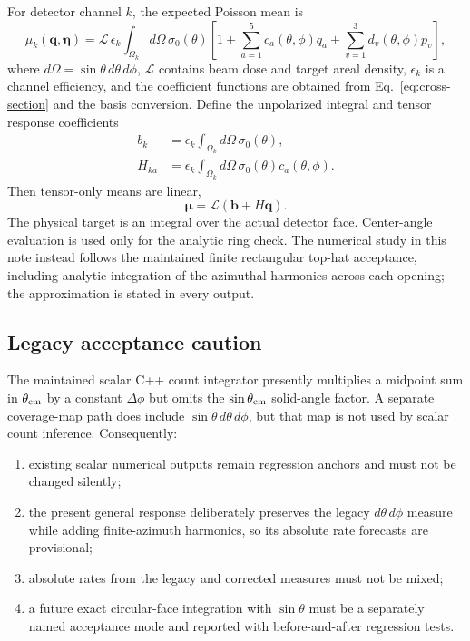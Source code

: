\documentclass[11pt,a4paper]{article}
\newcommand{\vect}[1]{\bm{#1}}
\begin{document}
For detector channel $k$, the expected Poisson mean is
\begin{equation}
 \mu_k(\vect q,\vect\eta)=
 \mathcal L\,\epsilon_k
 \int_{\Omega_k}d\Omega\,
 \sigma_0(\theta)
 \left[1+\sum_{a=1}^{5}c_a(\theta,\phi)q_a
 +\sum_{v=1}^{3}d_v(\theta,\phi)p_v\right],
 \label{eq:channel-mean}
\end{equation}
where $d\Omega=\sin\theta\,d\theta\,d\phi$, $\mathcal L$ contains beam dose
and target areal density, $\epsilon_k$ is a channel efficiency, and the
coefficient functions are obtained from Eq.~\eqref{eq:cross-section} and the
basis conversion.  Define the unpolarized integral and tensor response
coefficients
\begin{align}
 b_k&=\epsilon_k\int_{\Omega_k}d\Omega\,\sigma_0(\theta),\\
 H_{ka}&=\epsilon_k\int_{\Omega_k}d\Omega\,
 \sigma_0(\theta)c_a(\theta,\phi).
\end{align}
Then tensor-only means are linear,
\begin{equation}
 \vect\mu=\mathcal L(\vect b+H\vect q).
 \label{eq:linear-means}
\end{equation}
The physical target is an integral over the actual detector face.  Center-angle
evaluation is used only for the analytic ring check.  The numerical study in
this note instead follows the maintained finite rectangular top-hat acceptance,
including analytic integration of the azimuthal harmonics across each opening;
the approximation is stated in every output.

\subsection{Legacy acceptance caution}

The maintained scalar C++ count integrator presently multiplies a midpoint
sum in $\theta_{\rm cm}$ by a constant $\Delta\phi$ but omits the
$\sin\theta_{\rm cm}$ solid-angle factor.  A separate coverage-map path does
include $\sin\theta\,d\theta\,d\phi$, but that map is not used by scalar count
inference.  Consequently:
\begin{enumerate}
 \item existing scalar numerical outputs remain regression anchors and must not
 be changed silently;
 \item the present general response deliberately preserves the legacy
 $d\theta\,d\phi$ measure while adding finite-azimuth harmonics, so its absolute
 rate forecasts are provisional;
 \item absolute rates from the legacy and corrected measures must not be mixed;
 \item a future exact circular-face integration with $\sin\theta$ must be a
 separately named acceptance mode and reported with before-and-after regression
 tests.
\end{enumerate}
\end{document}

